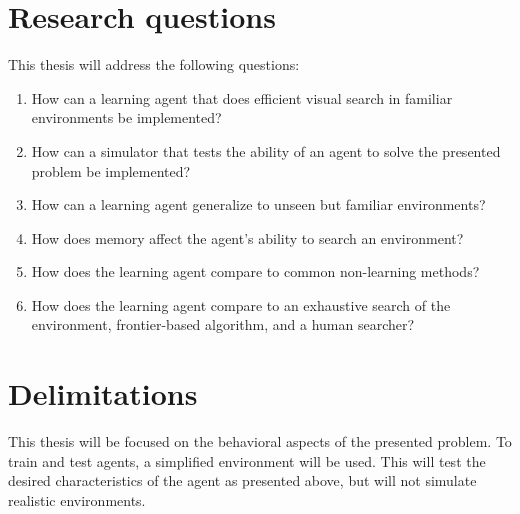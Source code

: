 \section{Research questions}
\label{sec:research-questions}

This thesis will address the following questions:

\begin{enumerate}
  \item How can a learning agent that does efficient visual search in familiar environments be implemented?
  \item How can a simulator that tests the ability of an agent to solve the presented problem be implemented?
  \item How can a learning agent generalize to unseen but familiar environments?
  \item How does memory affect the agent's ability to search an environment?
  \item How does the learning agent compare to common non-learning methods?
  \item How does the learning agent compare to an exhaustive search of the environment, frontier-based algorithm, and a human searcher?
\end{enumerate}


\section{Delimitations}
\label{sec:delimitations}

This thesis will be focused on the behavioral aspects of the presented problem. To train and test agents, a simplified environment will be used. This will test the desired characteristics of the agent as presented above, but will not simulate realistic environments.




